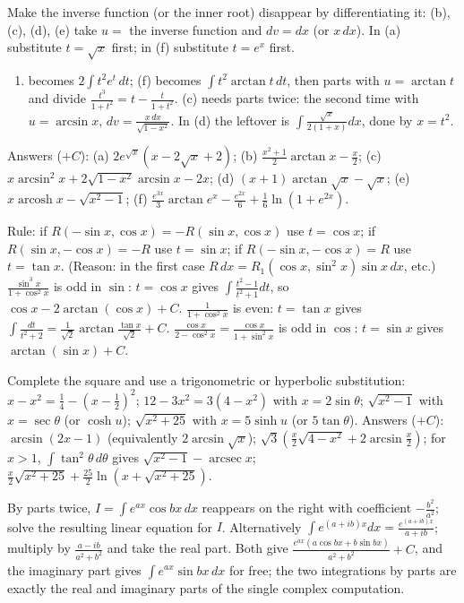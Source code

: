 \documentclass[11pt,a4paper]{article}
\begin{document}
Make the inverse function (or the inner root) disappear by differentiating it: (b), (c), (d), (e) take \(u=\) the inverse function and \(dv=dx\) (or \(x\,dx\)). In (a) substitute \(t=\sqrt x\) first; in (f) substitute \(t=e^x\) first.
\begin{enumerate}
\def\labelenumi{(\alph{enumi})}
\tightlist
\item
  becomes \(2\int t^2e^t\,dt\); (f) becomes \(\int t^2\arctan t\,dt\), then parts with \(u=\arctan t\) and divide \(\frac{t^3}{1+t^2}=t-\frac t{1+t^2}\). (c) needs parts twice: the second time with \(u=\arcsin x\), \(dv=\frac{x\,dx}{\sqrt{1-x^2}}\). In (d) the leftover is \(\int\frac{\sqrt x}{2(1+x)}dx\), done by \(x=t^2\).
\end{enumerate}
Answers (\(+C\)): (a) \(2e^{\sqrt x}(x-2\sqrt x+2)\); (b) \(\frac{x^2+1}2\arctan x-\frac x2\); (c) \(x\arcsin^2x+2\sqrt{1-x^2}\arcsin x-2x\); (d) \((x+1)\arctan\sqrt x-\sqrt x\); (e) \(x\operatorname{arcosh}x-\sqrt{x^2-1}\); (f) \(\frac{e^{3x}}3\arctan e^x-\frac{e^{2x}}6+\frac16\ln(1+e^{2x})\).

Rule: if \(R(-\sin x,\cos x)=-R(\sin x,\cos x)\) use \(t=\cos x\); if \(R(\sin x,-\cos x)=-R\) use \(t=\sin x\); if \(R(-\sin x,-\cos x)=R\) use \(t=\tan x\). (Reason: in the first case \(R\,dx=R_1(\cos x,\sin^2x)\sin x\,dx\), etc.)
\(\frac{\sin^3x}{1+\cos^2x}\) is odd in \(\sin\): \(t=\cos x\) gives \(\int\frac{t^2-1}{t^2+1}dt\), so \(\cos x-2\arctan(\cos x)+C\). \(\frac1{1+\cos^2x}\) is even: \(t=\tan x\) gives \(\int\frac{dt}{t^2+2}=\frac1{\sqrt2}\arctan\frac{\tan x}{\sqrt2}+C\). \(\frac{\cos x}{2-\cos^2x}=\frac{\cos x}{1+\sin^2x}\) is odd in \(\cos\): \(t=\sin x\) gives \(\arctan(\sin x)+C\).

Complete the square and use a trigonometric or hyperbolic substitution: \(x-x^2=\frac14-(x-\frac12)^2\); \(12-3x^2=3(4-x^2)\) with \(x=2\sin\theta\); \(\sqrt{x^2-1}\) with \(x=\sec\theta\) (or \(\cosh u\)); \(\sqrt{x^2+25}\) with \(x=5\sinh u\) (or \(5\tan\theta\)).
Answers (\(+C\)): \(\arcsin(2x-1)\) (equivalently \(2\arcsin\sqrt x\)); \(\sqrt3\left(\frac x2\sqrt{4-x^2}+2\arcsin\frac x2\right)\); for \(x\gt 1\), \(\int\tan^2\theta\,d\theta\) gives \(\sqrt{x^2-1}-\operatorname{arcsec}x\); \(\frac x2\sqrt{x^2+25}+\frac{25}2\ln\left(x+\sqrt{x^2+25}\right)\).

By parts twice, \(I=\int e^{ax}\cos bx\,dx\) reappears on the right with coefficient \(-\frac{b^2}{a^2}\); solve the resulting linear equation for \(I\). Alternatively \(\int e^{(a+ib)x}dx=\frac{e^{(a+ib)x}}{a+ib}\); multiply by \(\frac{a-ib}{a^2+b^2}\) and take the real part.
Both give \(\frac{e^{ax}(a\cos bx+b\sin bx)}{a^2+b^2}+C\), and the imaginary part gives \(\int e^{ax}\sin bx\,dx\) for free; the two integrations by parts are exactly the real and imaginary parts of the single complex computation.
\end{document}
